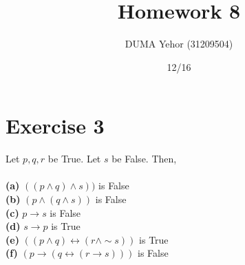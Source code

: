 \documentclass{article}
\title{Homework 8}
\author{DUMA Yehor (31209504)}
\date{12/16}
\begin{document}
\maketitle

\section{Exercise 3}
Let $p,q,r$ be True. Let $s$ be False. Then, \\ \\ 
\textbf{(a)} $((p\wedge q)\wedge s))$\hspace*{\fill} is False\\
\textbf{(b)} $(p\wedge (q\wedge s))$\hspace*{\fill} is False  \\
\textbf{(c)} $p\rightarrow s$\hspace*{\fill} is False\\
\textbf{(d)} $s\rightarrow p$\hspace*{\fill} is True \\
\textbf{(e)} $((p \wedge q) \leftrightarrow (r \wedge \sim s))$ \hspace*{\fill} is True\\
\textbf{(f)} $(p \rightarrow (q \leftrightarrow (r \rightarrow s)))$ \hspace*{\fill} is False \\
\end{document}
